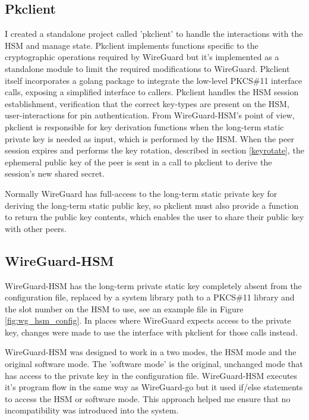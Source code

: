 \documentclass [11pt, proquest] {uwthesis}[2020/02/24]
\begin{document}
\subsection{Pkclient}
\label{pk_design}
I created a standalone project called 'pkclient' to handle the interactions with the HSM and manage state. Pkclient implements functions specific to the cryptographic operations required by WireGuard but it's implemented as a standalone module to limit the required modifications to WireGuard. Pkclient itself incorporates a golang package to integrate the low-level PKCS\#11 interface calls, exposing a simplified interface to callers.  Pkclient handles the HSM session establishment, verification that the correct key-types are present on the HSM, user-interactions for pin authentication. 
From WireGuard-HSM's point of view, pkclient is responsible for key derivation functions when the long-term static private key is needed as input, which is performed by the HSM. When the peer session expires and performs the key rotation, described in section \ref{keyrotate}, the ephemeral public key of the peer is sent in a call to pkclient to derive the session's new shared secret. 

Normally WireGuard has full-access to the long-term static private key for deriving the long-term static public key, so pkclient must also provide a function to return the public key contents, which enables the user to share their public key with other peers.


\subsection{WireGuard-HSM}
WireGuard-HSM has the long-term private static key completely absent from the configuration file, replaced by a system library path to a PKCS\#11 library and the slot number on the HSM to use, see an example file in Figure \ref{fig:wg_hsm_config}.  In places where WireGuard expects access to the private key, changes were made to use the interface with pkclient for those calls instead.

WireGuard-HSM was designed to work in a two modes, the HSM mode and the original software mode. 
The 'software mode' is the original, unchanged mode that has access to the private key in the configuration file. WireGuard-HSM executes it's program flow in the same way as WireGuard-go but it used if/else statements to access the HSM or software mode. This approach helped me ensure that no incompatibility was introduced into the system. 
\end{document}
